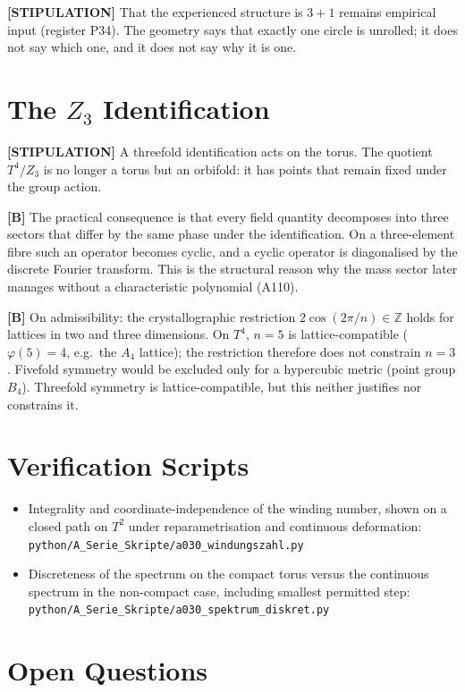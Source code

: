 \textbf{[STIPULATION]} That the experienced structure is $3+1$ remains
empirical input (register P34). The geometry says that exactly one circle
is unrolled; it does not say which one, and it does not say why it is one.

\section{The $Z_3$ Identification}

\textbf{[STIPULATION]} A threefold identification acts on the torus. The
quotient $T^4/Z_3$ is no longer a torus but an orbifold: it has points
that remain fixed under the group action.

\textbf{[B]} The practical consequence is that every field quantity decomposes
into three sectors that differ by the same phase under the identification.
On a three-element fibre such an operator becomes cyclic, and a cyclic operator
is diagonalised by the discrete Fourier transform. This is the structural reason
why the mass sector later manages without a characteristic polynomial (A110).

\textbf{[B]} On admissibility: the crystallographic restriction
$2\cos(2\pi/n)\in\mathbb{Z}$ holds for lattices in two and three dimensions.
On $T^4$, $n=5$ is lattice-compatible ($\varphi(5)=4$, e.g.\ the $A_4$
lattice); the restriction therefore does not constrain $n=3$. Fivefold symmetry
would be excluded only for a hypercubic metric (point group $B_4$). Threefold
symmetry is lattice-compatible, but this neither justifies nor constrains it.

\section{Verification Scripts}

\begin{itemize}
  \item Integrality and coordinate-independence of the winding number, shown
    on a closed path on $T^2$ under reparametrisation and continuous deformation:
    \texttt{python/A\_Serie\_Skripte/a030\_windungszahl.py}
  \item Discreteness of the spectrum on the compact torus versus the continuous
    spectrum in the non-compact case, including smallest permitted step:
    \texttt{python/A\_Serie\_Skripte/a030\_spektrum\_diskret.py}
\end{itemize}

\section{Open Questions}

